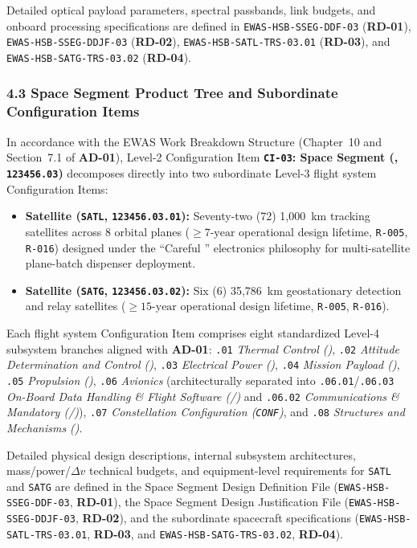 Detailed optical payload parameters, spectral passbands, link budgets, and onboard processing specifications are defined in \texttt{EWAS-HSB-SSEG-DDF-03} (\textbf{RD-01}), \texttt{EWAS-HSB-SSEG-DDJF-03} (\textbf{RD-02}), \texttt{EWAS-HSB-SATL-TRS-03.01} (\textbf{RD-03}), and \texttt{EWAS-HSB-SATG-TRS-03.02} (\textbf{RD-04}).

\subsubsection{4.3 Space Segment Product Tree and Subordinate Configuration Items}

In accordance with the EWAS Work Breakdown Structure (Chapter~10 and Section~7.1 of \textbf{AD-01}), Level-2 Configuration Item \textbf{\texttt{CI-03}: Space Segment (,  \texttt{123456.03})} decomposes directly into two subordinate Level-3 flight system Configuration Items:
\begin{itemize}
    \item \textbf{Satellite  (\texttt{SATL},  \texttt{123456.03.01}):} Seventy-two (72) 1,000~km tracking satellites across 8 orbital planes ($\ge 7\text{-year}$ operational design lifetime, \texttt{R-005}, \texttt{R-016}) designed under the ``Careful '' electronics philosophy for multi-satellite plane-batch dispenser deployment.
    \item \textbf{Satellite  (\texttt{SATG},  \texttt{123456.03.02}):} Six (6) 35,786~km geostationary detection and relay satellites ($\ge 15\text{-year}$ operational design lifetime, \texttt{R-005}, \texttt{R-016}).
\end{itemize}

Each flight system Configuration Item comprises eight standardized Level-4 subsystem branches aligned with \textbf{AD-01}: \texttt{.01} \emph{Thermal Control ()}, \texttt{.02} \emph{Attitude Determination and Control ()}, \texttt{.03} \emph{Electrical Power ()}, \texttt{.04} \emph{Mission Payload ()}, \texttt{.05} \emph{Propulsion ()}, \texttt{.06} \emph{Avionics} (architecturally separated into \texttt{.06.01}/\texttt{.06.03} \emph{On-Board Data Handling \& Flight Software (/)} and \texttt{.06.02} \emph{Communications \& Mandatory  (/)}), \texttt{.07} \emph{Constellation Configuration (\texttt{CONF})}, and \texttt{.08} \emph{Structures and Mechanisms ()}.

Detailed physical design descriptions, internal subsystem architectures, mass/power/$\Delta v$ technical budgets, and equipment-level requirements for \texttt{SATL} and \texttt{SATG} are defined in the Space Segment Design Definition File (\texttt{EWAS-HSB-SSEG-DDF-03}, \textbf{RD-01}), the Space Segment Design Justification File (\texttt{EWAS-HSB-SSEG-DDJF-03}, \textbf{RD-02}), and the subordinate spacecraft specifications (\texttt{EWAS-HSB-SATL-TRS-03.01}, \textbf{RD-03}, and \texttt{EWAS-HSB-SATG-TRS-03.02}, \textbf{RD-04}).
